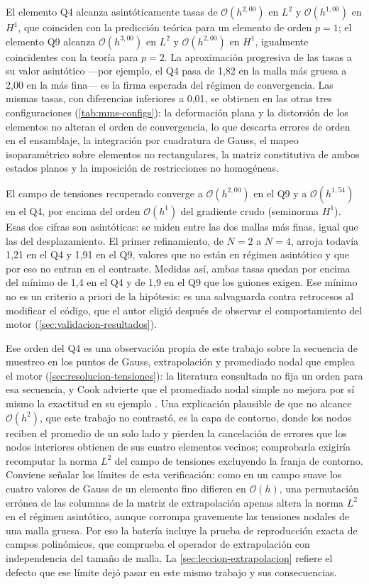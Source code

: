 El elemento Q4 alcanza asintóticamente tasas de $\mathcal{O}(h^{2{,}00})$ en $L^2$ y $\mathcal{O}(h^{1{,}00})$ en $H^1$, que coinciden con la predicción teórica para un elemento de orden $p=1$; el elemento Q9 alcanza $\mathcal{O}(h^{3{,}00})$ en $L^2$ y $\mathcal{O}(h^{2{,}00})$ en $H^1$, igualmente coincidentes con la teoría para $p=2$. La aproximación progresiva de las tasas a su valor asintótico ---por ejemplo, el Q4 pasa de 1,82 en la malla más gruesa a 2,00 en la más fina--- es la firma esperada del régimen de convergencia. Las mismas tasas, con diferencias inferiores a 0,01, se obtienen en las otras tres configuraciones (\autoref{tab:mms-configs}): la deformación plana y la distorsión de los elementos no alteran el orden de convergencia, lo que descarta errores de orden en el ensamblaje, la integración por cuadratura de Gauss, el mapeo isoparamétrico sobre elementos no rectangulares, la matriz constitutiva de ambos estados planos y la imposición de restricciones no homogéneas.

El campo de tensiones recuperado converge a $\mathcal{O}(h^{2{,}00})$ en el Q9 y a $\mathcal{O}(h^{1{,}54})$ en el Q4, por encima del orden $\mathcal{O}(h^{1})$ del gradiente crudo (seminorma $H^1$). Esas dos cifras son asintóticas: se miden entre las dos mallas más finas, igual que las del desplazamiento. El primer refinamiento, de $N=2$ a $N=4$, arroja todavía 1,21 en el Q4 y 1,91 en el Q9, valores que no están en régimen asintótico y que por eso no entran en el contraste. Medidas así, ambas tasas quedan por encima del mínimo de 1,4 en el Q4 y de 1,9 en el Q9 que los guiones exigen. Ese mínimo no es un criterio a priori de la hipótesis: es una salvaguarda contra retrocesos al modificar el código, que el autor eligió después de observar el comportamiento del motor (\autoref{sec:validacion-resultados}).

Ese orden del Q4 es una observación propia de este trabajo sobre la secuencia de muestreo en los puntos de Gauss, extrapolación y promediado nodal que emplea el motor (\autoref{sec:resolucion-tensiones}): la literatura consultada no fija un orden para esa secuencia, y Cook advierte que el promediado nodal simple no mejora por sí mismo la exactitud en su ejemplo \autocite[p.~231]{cook2002concepts}. Una explicación plausible de que no alcance $\mathcal{O}(h^{2})$, que este trabajo no contrastó, es la capa de contorno, donde los nodos reciben el promedio de un solo lado y pierden la cancelación de errores que los nodos interiores obtienen de sus cuatro elementos vecinos; comprobarla exigiría recomputar la norma $L^2$ del campo de tensiones excluyendo la franja de contorno. Conviene señalar los límites de esta verificación: como en un campo suave los cuatro valores de Gauss de un elemento fino difieren en $\mathcal{O}(h)$, una permutación errónea de las columnas de la matriz de extrapolación apenas altera la norma $L^2$ en el régimen asintótico, aunque corrompa gravemente las tensiones nodales de una malla gruesa. Por eso la batería incluye la prueba de reproducción exacta de campos polinómicos, que comprueba el operador de extrapolación con independencia del tamaño de malla. La \autoref{sec:leccion-extrapolacion} refiere el defecto que ese límite dejó pasar en este mismo trabajo y sus consecuencias.

